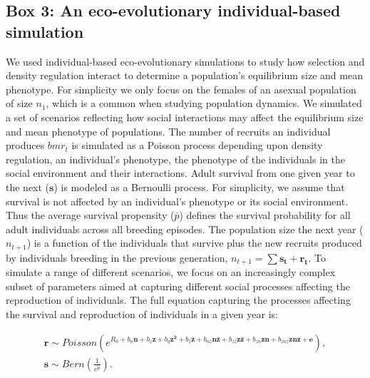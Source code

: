 \documentclass{article}
\begin{document}
\subsection{Box 3: An eco-evolutionary individual-based simulation}
We used individual-based eco-evolutionary simulations to study how selection and density regulation interact to determine a population's equilibrium size and mean phenotype. For simplicity we only focus on the females of an asexual population of size $n_{1}$, which is a common when studying population dynamics. We simulated a set of scenarios reflecting how social interactions may affect the equilibrium size and mean phenotype of populations. The number of recruits an individual produces $bm{r_{t}}$ is simulated as a Poisson process depending upon density regulation, an individual's phenotype, the phenotype of the individuals in the social environment and their interactions. Adult survival from one given year to the next ($\bm{s}$) is modeled as a Bernoulli process. For simplicity, we assume that survival is not affected by an individual's phenotype or its social environment. Thus the average survival propensity ($\bar{p}$) defines the survival probability for all adult individuals across all breeding episodes. The population size the next year ($n_{t+1}$) is a function of the individuals that survive plus the new recruits produced by individuals breeding in the previous generation, $n_{t+1}=\sum \bm{s_{t}} + \bm{r_{t}}$. To simulate a range of different scenarios, we focus on an increasingly complex subset of parameters aimed at capturing different social processes affecting the reproduction of individuals. The full equation capturing the processes affecting the survival and reproduction of individuals in a given year is:

\begin{subequations} 
	\begin{gather}
	\bm{r}\sim Poisson(e^{R_{0} + b_{n} \bm{n} + b_{z} \bm{z} + b_{q} \bm{z^2} + b_{\bar{z}} \bm{\bar{z}} + b_{n \bar{z}} \bm{n\bar{z}} + b_{z\bar{z}}  \bm{z\bar{z}} + b_{zn}  \bm{zn} + b_{zn \bar{z}} \bm{zn\bar{z}}+  \bm{e}}), \label{eq:Full1a} \\
	\bm{s}\sim Bern(\frac{1}{e^{\bar{p}}}). \label{eq:Full1b}
	\end{gather}
\end{subequations}
\end{document}
